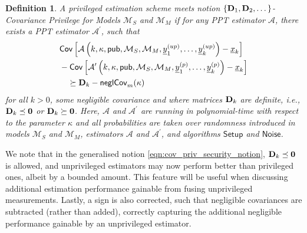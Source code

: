 \documentclass[conference]{IEEEtran}
\newtheorem{definition}{Definition}[section]
\begin{document}
\begin{definition}
  A privileged estimation scheme meets notion \textit{$\{{{\mathbf{D}}}_1,{{\mathbf{D}}}_2,\dots\}$-Covariance Privilege for Models $\mathcal{M}_S$ and $\mathcal{M}_M$} if for any PPT estimator $\mathcal{A}$, there exists a PPT estimator $\mathcal{A}^\prime$, such that
  \begin{equation}\label{eqn:cov_priv_security_notion}
    \begin{split}
      &\mathsf{Cov}\left[\mathcal{A}\left(k,\kappa,\mathsf{pub},\mathcal{M}_S,\mathcal{M}_M,\vec{y}^{(up)}_1,\dots,\vec{y}^{(up)}_k\right) - \vec{x}_k\right]\\
      &-\mathsf{Cov}\left[\mathcal{A}^\prime\left(k,\kappa,\mathsf{pub},\mathcal{M}_S,\mathcal{M}_M,\vec{y}^{(p)}_1,\dots,\vec{y}^{(p)}_k\right) - \vec{x}_k\right]\\
      &\quad\succeq \mat{D}_k - \mathsf{neglCov}_m(\kappa)
    \end{split}
  \end{equation}
  for all $k>0$, some negligible covariance and where matrices ${{\mathbf{D}}}_k$ are definite, \textit{i.e.}, ${{\mathbf{D}}}_k \preceq {\ensuremath{{\mathbf{0}}}}$ or ${{\mathbf{D}}}_k \succeq {\ensuremath{{\mathbf{0}}}}$. Here, $\mathcal{A}$ and $\mathcal{A}^\prime$ are running in polynomial-time with respect to the parameter $\kappa$ and all probabilities are taken over randomness introduced in models $\mathcal{M}_S$ and $\mathcal{M}_M$, estimators $\mathcal{A}$ and $\mathcal{A}^\prime$, and algorithms $\mathsf{Setup}$ and $\mathsf{Noise}$.
\end{definition}
We note that in the generalised notion \eqref{eqn:cov_priv_security_notion}, ${{\mathbf{D}}}_k\preceq {\ensuremath{{\mathbf{0}}}}$ is allowed, and unprivileged estimators may now perform better than privileged ones, albeit by a bounded amount. This feature will be useful when discussing additional estimation performance gainable from fusing unprivileged measurements. Lastly, a sign is also corrected, such that negligible covariances are subtracted (rather than added), correctly capturing the additional negligible performance gainable by an unprivileged estimator.

% 
%                                                                      
%                                                                      
%                                                                      
% 
\end{document}
